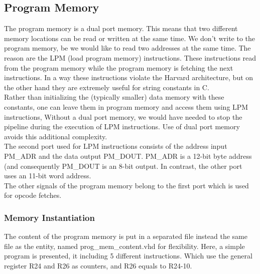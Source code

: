 \documentclass[12pt,a4paper]{report}
\begin{document}
\subsection{Program Memory}

The program memory is a dual port memory. This means that two different memory locations can be read or written at the same time. We don't write to the program memory, be we would like to read two addresses at the same time. The reason are the LPM (load program memory) instructions. These instructions read from the program memory while the program memory is fetching the next instructions. In a way these instructions violate the Harvard architecture, but on the other hand they are extremely useful for string constants in C.\\
Rather than initializing the (typically smaller) data memory with these constants, one can leave them in program memory and access them using LPM instructions, Without a dual port memory, we would have needed to stop the pipeline during the execution of LPM instructions. Use of dual port memory avoids this additional complexity.\\
The second port used for LPM instructions consists of the address input PM\_ADR and the data output PM\_DOUT. PM\_ADR is a 12-bit byte address (and consequently PM\_DOUT is an 8-bit output. In contrast, the other port uses an 11-bit word address.\\
The other signals of the program memory belong to the first port which is used for opcode fetches.
\subsubsection{Memory Instantiation}

The content of the program memory is put in a separated file instead the same file as the entity, named prog\_mem\_content.vhd for flexibility. Here, a simple program is presented, it including 5 different instructions. Which use the general register R24 and R26 as counters, and R26 equals to R24-10.
\end{document}
